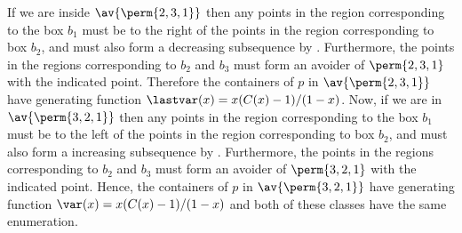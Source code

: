 If we are inside \(\av{\perm{2,3,1}}\) then any points in the region corresponding
to the box \(b_1\) must be to the right of the points in the region corresponding to
box \(b_2\), and must also form a decreasing subsequence by .
Furthermore, the points in the regions corresponding to \(b_2\) and
\(b_3\) must form an avoider of \(\perm{2,3,1}\) with the indicated point.
Therefore the containers of \(p\) in \(\av{\perm{2,3,1}}\) have generating function
\(\lastvar(x) = x(C(x)-1)/(1-x)\).
Now, if we are in \(\av{\perm{3,2,1}}\) then any points in the region corresponding
to the box \(b_1\) must be to the left of the points in the region corresponding to
box \(b_2\), and must also form a increasing subsequence by .
Furthermore, the points in the regions corresponding to \(b_2\) and
\(b_3\) must form an avoider of \(\perm{3,2,1}\) with the indicated point.
Hence, the containers of \(p\) in \(\av{\perm{3,2,1}}\) have generating function
\(\var(x) = x(C(x)-1)/(1-x)\) and both of these classes have the same
enumeration.

